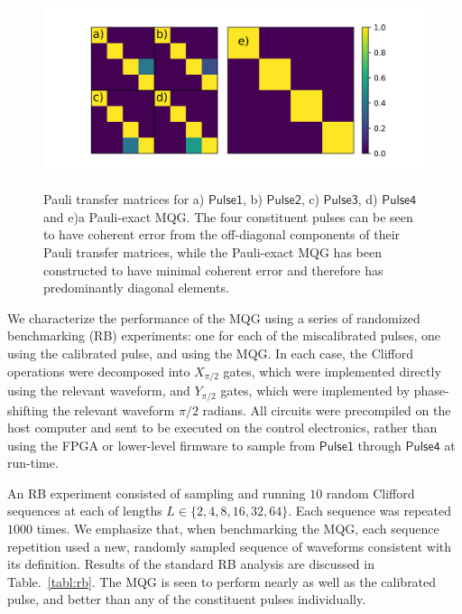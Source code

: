 \documentclass[aps,nofootinbib,pra,notitlepage,twocolumn]{revtex4-1}
\newcommand{\0}{\ensuremath{\mathbf{0}}}
\begin{document}
\begin{figure}
\includegraphics[scale=.5]{experimental-ptm.png}
\label{ptms}
\caption{Pauli transfer matrices for a) $\mathsf{Pulse1}$, b) $\mathsf{Pulse2}$, c) $\mathsf{Pulse3}$, d) $\mathsf{Pulse4}$ and e)a Pauli-exact MQG. The four constituent pulses can be seen to have coherent error from the off-diagonal components of their Pauli transfer matrices, while the Pauli-exact MQG has been constructed to have minimal coherent error and therefore has predominantly diagonal elements.}   
\end{figure}

We characterize the performance of the MQG using a series of randomized benchmarking (RB) experiments\cite{Magesan2011}: one for each of the miscalibrated pulses, one using the calibrated pulse, and using the MQG. In each case, the Clifford operations were decomposed into $X_{\pi/2}$ gates, which were implemented directly using the relevant waveform, and $Y_{\pi/2}$ gates, which were implemented by phase-shifting the relevant waveform $\pi/2$ radians. All circuits were precompiled on the host computer and sent to be executed on the control electronics, rather than using the FPGA or lower-level firmware to sample from $\mathsf{Pulse1}$ through $\mathsf{Pulse4}$ at run-time.

An RB experiment consisted of sampling and running $10$ random Clifford sequences at each of lengths $L\in\{2, 4, 8, 16, 32, 64\}$. Each sequence was repeated $1000$ times. We emphasize that, when benchmarking the MQG, each sequence repetition used a new, randomly sampled sequence of waveforms consistent with its definition. Results of the standard RB analysis are discussed in Table.~\ref{tabl:rb}. The MQG is seen to perform nearly as well as the calibrated pulse, and better than any of the constituent pulses individually.  
\end{document}

